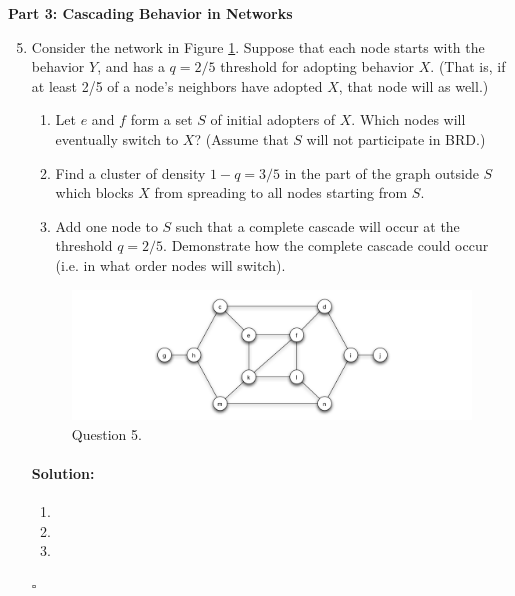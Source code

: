 \documentclass[11pt,letterpaper]{article}
\newif \iftemplate \templatetrue
\newenvironment{solution}{\paragraph{Solution:}}{\hfill$\square$}
\theoremstyle{definition}
\begin{document}
\noindent
{\Large\textbf{Part 3: Cascading Behavior in Networks}\par}

\begin{enumerate}
\setcounter{enumi}{4}
\item Consider the network in Figure \ref{q7.fig}. Suppose that each node starts with the behavior $Y$, and has a $q = 2/5$ threshold for adopting behavior $X$. (That is, if at least 2/5 of a node's neighbors have adopted $X$, that node will as well.)
\begin{enumerate}
\item Let $e$ and $f$ form a set $S$ of initial adopters of $X$. Which nodes will eventually switch to $X$? (Assume that $S$ will not participate in BRD.)
\item Find a cluster of density $1 - q = 3/5$ in the part of the graph outside $S$ which blocks $X$ from spreading to all nodes starting from $S$.
\item Add one node to $S$ such that a complete cascade will occur at the threshold $q = 2/5$. Demonstrate how the complete cascade could occur (i.e. in what order nodes will switch).
\end{enumerate}
\begin{figure}
\includegraphics[width=\linewidth]{figure.jpg}
\caption{Question 5.}
\label{q7.fig}
\end{figure}

\iftemplate
\begin{solution}
\begin{enumerate}[label=(\alph*)]
\item 
\item 
\item
\end{enumerate}
\end{solution}
\newpage
\fi


\end{enumerate}
\end{document}

